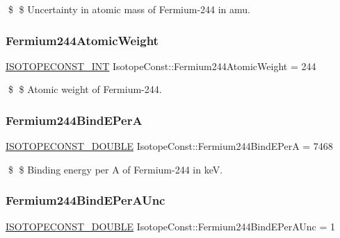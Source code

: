 \$ \$ Uncertainty in atomic mass of Fermium-\/244 in amu. \mbox{\label{group___isotope_const-_fermium-_fm244_ga5f6fb776f9e294aeac1e723b3ac6234a}} 
\subsubsection{\texorpdfstring{Fermium244\+Atomic\+Weight}{Fermium244AtomicWeight}}
{\footnotesize\ttfamily \mbox{\hyperlink{group___isotope_const-_macros_ga5f18360b3e99483a35c32d789e62621c}{I\+S\+O\+T\+O\+P\+E\+C\+O\+N\+S\+T\+\_\+\+I\+NT}} Isotope\+Const\+::\+Fermium244\+Atomic\+Weight = 244}

\$ \$ Atomic weight of Fermium-\/244. \mbox{\label{group___isotope_const-_fermium-_fm244_gad6c6bbe25fc66aa42444fcfc91a3ccac}} 
\subsubsection{\texorpdfstring{Fermium244\+Bind\+E\+PerA}{Fermium244BindEPerA}}
{\footnotesize\ttfamily \mbox{\hyperlink{group___isotope_const-_macros_ga8f45a7272ce02c0b4c65c44636ed719a}{I\+S\+O\+T\+O\+P\+E\+C\+O\+N\+S\+T\+\_\+\+D\+O\+U\+B\+LE}} Isotope\+Const\+::\+Fermium244\+Bind\+E\+PerA = 7468}

\$ \$ Binding energy per A of Fermium-\/244 in keV. \mbox{\label{group___isotope_const-_fermium-_fm244_gafe3ae12510e8fce5c4bfd46ecf5e65f6}} 
\subsubsection{\texorpdfstring{Fermium244\+Bind\+E\+Per\+A\+Unc}{Fermium244BindEPerAUnc}}
{\footnotesize\ttfamily \mbox{\hyperlink{group___isotope_const-_macros_ga8f45a7272ce02c0b4c65c44636ed719a}{I\+S\+O\+T\+O\+P\+E\+C\+O\+N\+S\+T\+\_\+\+D\+O\+U\+B\+LE}} Isotope\+Const\+::\+Fermium244\+Bind\+E\+Per\+A\+Unc = 1}

